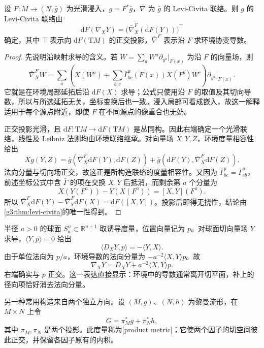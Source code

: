 \begin{proposition}\label{g3:prop:induced-connection-projection}
	设 \(F:M\rightarrow(N,\bar g)\) 为光滑浸入，\(g=F^*\bar g\)，\(\bar\nabla\) 为 \(\bar g\) 的 Levi-Civita 联络。则 \(g\) 的 Levi-Civita 联络由
	\begin{equation}\label{g3:eq:induced-connection-projection}
		\mathrm dF(\nabla_XY)
		=\bigl(\bar\nabla^F_X(\mathrm dF(Y))\bigr)^\top
	\end{equation}
	确定，其中 \(\top\) 表示向 \(\mathrm dF(\mathrm TM)\) 的正交投影，\(\bar\nabla^F\) 表示沿 \(F\) 求环境协变导数。
\end{proposition}
\begin{proof}
	先说明沿映射求导的含义。若 \(W=\sum_aW^a\partial_{y^a}|_{F(x)}\) 为沿 \(F\) 的向量场，则
	\[
		\bar\nabla^F_XW
		=\sum_a\left(X(W^a)+\sum_{b,c}\bar\Gamma^a_{bc}(F(x))
		X(F^b)W^c\right)\partial_{y^a}|_{F(x)}.
	\]
	它就是在环境局部延拓后沿 \(\mathrm dF(X)\) 求导；公式只使用沿 \(F\) 的取值及其切向导数，所以与所选延拓无关，坐标变换后也一致。浸入局部可看成嵌入，故这一解释适用于每个源点附近，即使 \(F\) 在不同源点的像重合也无妨。

	正交投影光滑，且 \(\mathrm dF:\mathrm TM\rightarrow\mathrm dF(\mathrm TM)\) 是丛同构。因此右端确定一个光滑联络，线性及 Leibniz 法则均由环境联络继承。对向量场 \(X,Y,Z\)，环境度量相容性给出
	\[
		Xg(Y,Z)=\bar g(\bar\nabla^F_X\mathrm dF(Y),\mathrm dF(Z))
		+\bar g(\mathrm dF(Y),\bar\nabla^F_X\mathrm dF(Z)).
	\]
	法向分量与切向场正交，故这正是所构造联络的度量相容性。又因为 \(\bar\Gamma^a_{bc}=\bar\Gamma^a_{cb}\)，前述坐标公式中含 \(\bar\Gamma\) 的项在交换 \(X,Y\) 后抵消，而剩余第 \(a\) 个分量为
	\[
		X(Y(F^a))-Y(X(F^a))=[X,Y](F^a).
	\]
	所以 \(\bar\nabla^F_X\mathrm dF(Y)-\bar\nabla^F_Y\mathrm dF(X)=\mathrm dF([X,Y])\)。投影后即得无挠性，结论由\cref{g3:thm:levi-civita}的唯一性得到。
\end{proof}

\begin{example}\label{g3:exm:round-sphere-connection}
	半径 \(a>0\) 的球面 \(S_a^n\subset\mathbb R^{n+1}\) 取诱导度量，位置向量记为 \(p\)。对球面切向量场 \(Y\) 求导，\(\langle Y,p\rangle=0\) 给出
	\[
		\langle D_XY,p\rangle=-\langle Y,X\rangle.
	\]
	由于单位法向为 \(p/a\)，环境导数的法向分量为 \(-a^{-2}\langle X,Y\rangle p\)。故
	\[
		\nabla_XY=D_XY+a^{-2}\langle X,Y\rangle p.
	\]
	右端确实与 \(p\) 正交。这一表达直接显示：环境中的导数通常离开切平面，补上的径向项恰好消去法向分量。
\end{example}

另一种常用构造来自两个独立方向。设 \((M,g)\)、\((N,h)\) 为黎曼流形，在 \(M\times N\) 上令
\[
	G=\pi_M^*g+\pi_N^*h,
\]
其中 \(\pi_M,\pi_N\) 是两个投影。此度量称为[product metric]；它使两个因子的切空间彼此正交，并保留各因子原有的内积。

